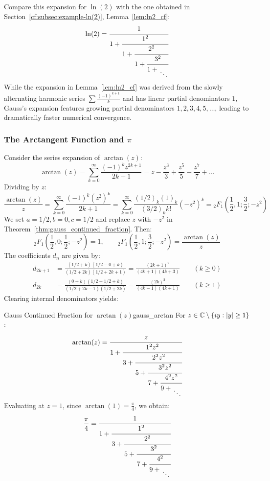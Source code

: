 \documentclass[a4paper]{article}
\begin{document}
\begin{remark}
  Compare this expansion for $\ln(2)$ with the one obtained in Section~\ref{cf:subsec:example-ln(2)}, Lemma~\ref{lem:ln2_cf}:
  \[
    \ln(2) = \cfrac{1}{1+\cfrac{1^{2}}{1 +\cfrac{2^2}{1 + \cfrac{3^2}{1 + \CFDots}}}}
  \]
  While the expansion in Lemma~\ref{lem:ln2_cf} was derived from the slowly alternating harmonic series $\sum \frac{(-1)^{k+1}}{k}$ and has linear partial denominators $1$, Gauss's expansion features growing partial denominators $1, 2, 3, 4, 5, \dots$, leading to dramatically faster numerical convergence.
\end{remark}

\subsubsection{The Arctangent Function and \texorpdfstring{$\pi$}{pi}}
Consider the series expansion of $\arctan(z)$:
\[
  \arctan(z) = \sum_{k=0}^\infty \frac{(-1)^k z^{2k+1}}{2k+1} = z - \frac{z^3}{3} + \frac{z^5}{5} - \frac{z^7}{7} + \dots
\]
Dividing by $z$:
\[
  \frac{\arctan(z)}{z} = \sum_{k=0}^\infty \frac{(-1)^k (z^2)^k}{2k+1} = \sum_{k=0}^\infty \frac{(1/2)_k (1)_k}{(3/2)_k k!} (-z^2)^k = {_2F_1}\left(\frac{1}{2}, 1; \frac{3}{2}; -z^2\right)
\]
We set $a = 1/2, b = 0, c = 1/2$ and replace $z$ with $-z^2$ in Theorem~\ref{thm:gauss_continued_fraction}.
Then:
\[
  {_2F_1}\left(\frac{1}{2}, 0; \frac{1}{2}; -z^2\right) = 1, \qquad {_2F_1}\left(\frac{1}{2}, 1; \frac{3}{2}; -z^2\right) = \frac{\arctan(z)}{z}
\]
The coefficients $d_n$ are given by:
\begin{align*}
  d_{2k+1} & = \frac{(1/2+k)(1/2-0+k)}{(1/2+2k)(1/2+2k+1)} = \frac{(2k+1)^2}{(4k+1)(4k+3)} \qquad (k \ge 0) \\
  d_{2k}   & = \frac{(0+k)(1/2-1/2+k)}{(1/2+2k-1)(1/2+2k)} = \frac{(2k)^2}{(4k-1)(4k+1)} \qquad (k \ge 1)
\end{align*}
Clearing internal denominators yields:

\begin{mylemma}{Gauss Continued Fraction for \texorpdfstring{$\arctan(z)$}{arctan(z)}}{gauss_arctan}
  For $z \in \mathbb{C} \setminus \{i y : |y| \ge 1\}$:
  \[
    \arctan(z) = \cfrac{z}{1 + \cfrac{1^2 z^2}{3 + \cfrac{2^2 z^2}{5 + \cfrac{3^2 z^2}{7 + \cfrac{4^2 z^2}{9 + \CFDots}}}}}
  \]
  Evaluating at $z = 1$, since $\arctan(1) = \frac{\pi}{4}$, we obtain:
  \[
    \frac{\pi}{4} = \cfrac{1}{1 + \cfrac{1^2}{3 + \cfrac{2^2}{5 + \cfrac{3^2}{7 + \cfrac{4^2}{9 + \CFDots}}}}}
  \]
\end{mylemma}
\end{document}
